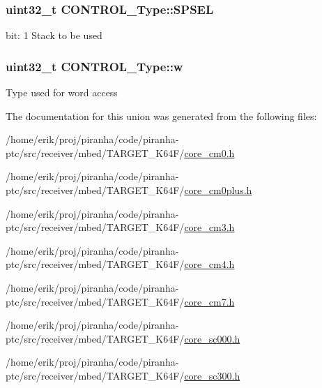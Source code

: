 \subsubsection[{\texorpdfstring{S\+P\+S\+EL}{SPSEL}}]{\setlength{\rightskip}{0pt plus 5cm}uint32\+\_\+t C\+O\+N\+T\+R\+O\+L\+\_\+\+Type\+::\+S\+P\+S\+EL}\hypertarget{unionCONTROL__Type_a8cc085fea1c50a8bd9adea63931ee8e2}{}\label{unionCONTROL__Type_a8cc085fea1c50a8bd9adea63931ee8e2}
bit\+: 1 Stack to be used 
\subsubsection[{\texorpdfstring{w}{w}}]{\setlength{\rightskip}{0pt plus 5cm}uint32\+\_\+t C\+O\+N\+T\+R\+O\+L\+\_\+\+Type\+::w}\hypertarget{unionCONTROL__Type_a6b642cca3d96da660b1198c133ca2a1f}{}\label{unionCONTROL__Type_a6b642cca3d96da660b1198c133ca2a1f}
Type used for word access 

The documentation for this union was generated from the following files\+:\begin{DoxyCompactItemize}
\item 
/home/erik/proj/piranha/code/piranha-\/ptc/src/receiver/mbed/\+T\+A\+R\+G\+E\+T\+\_\+\+K64\+F/\hyperlink{core__cm0_8h}{core\+\_\+cm0.\+h}\item 
/home/erik/proj/piranha/code/piranha-\/ptc/src/receiver/mbed/\+T\+A\+R\+G\+E\+T\+\_\+\+K64\+F/\hyperlink{core__cm0plus_8h}{core\+\_\+cm0plus.\+h}\item 
/home/erik/proj/piranha/code/piranha-\/ptc/src/receiver/mbed/\+T\+A\+R\+G\+E\+T\+\_\+\+K64\+F/\hyperlink{core__cm3_8h}{core\+\_\+cm3.\+h}\item 
/home/erik/proj/piranha/code/piranha-\/ptc/src/receiver/mbed/\+T\+A\+R\+G\+E\+T\+\_\+\+K64\+F/\hyperlink{core__cm4_8h}{core\+\_\+cm4.\+h}\item 
/home/erik/proj/piranha/code/piranha-\/ptc/src/receiver/mbed/\+T\+A\+R\+G\+E\+T\+\_\+\+K64\+F/\hyperlink{core__cm7_8h}{core\+\_\+cm7.\+h}\item 
/home/erik/proj/piranha/code/piranha-\/ptc/src/receiver/mbed/\+T\+A\+R\+G\+E\+T\+\_\+\+K64\+F/\hyperlink{core__sc000_8h}{core\+\_\+sc000.\+h}\item 
/home/erik/proj/piranha/code/piranha-\/ptc/src/receiver/mbed/\+T\+A\+R\+G\+E\+T\+\_\+\+K64\+F/\hyperlink{core__sc300_8h}{core\+\_\+sc300.\+h}\end{DoxyCompactItemize}
